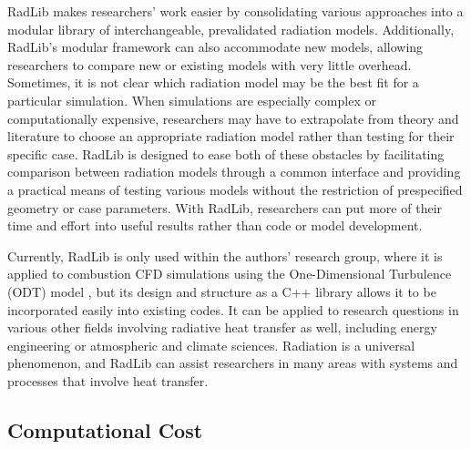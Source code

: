 \documentclass[preprint,12pt]{elsarticle}
\begin{document}
RadLib makes researchers' work easier by consolidating various approaches into a modular library of interchangeable, prevalidated radiation models. Additionally, RadLib's modular framework can also accommodate new models, allowing researchers to compare new or existing models with very little overhead. Sometimes, it is not clear which radiation model may be the best fit for a particular simulation. When simulations are especially complex or computationally expensive, researchers may have to extrapolate from theory and literature to choose an appropriate radiation model rather than testing for their specific case. RadLib is designed to ease both of these obstacles by facilitating comparison between radiation models through a common interface and providing a practical means of testing various models without the restriction of prespecified geometry or case parameters. With RadLib, researchers can put more of their time and effort into useful results rather than code or model development. 

Currently, RadLib is only used within the authors' research group, where it is applied to combustion CFD simulations using the One-Dimensional Turbulence (ODT) model \cite{Stephens_2020}, but its design and structure as a C++ library allows it to be incorporated easily into existing codes. It can be applied to  research questions in various other fields involving radiative heat transfer as well, including energy engineering or atmospheric and climate sciences. Radiation is a universal phenomenon, and RadLib can assist researchers in many areas with systems and processes that involve heat transfer. 


\subsection{Computational Cost} \label{s:cost}
\end{document}
